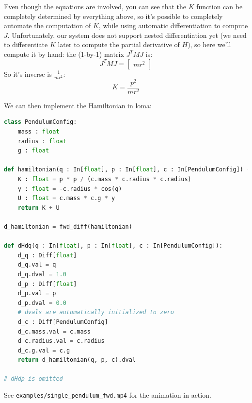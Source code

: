 Even though the equations are involved, you can see that the $K$ function can be completely determined by everything above, so it's possible to completely automate the computation of $K$, while using automatic differentiation to compute $J$. Unfortunately, our system does not support nested differentiation yet (we need to differentiate $K$ later to compute the partial derivative of $H$), so here we'll compute it by hand: the (1-by-1) matrix $J^TMJ$ is:
\begin{equation}
J^TMJ = 
\begin{bmatrix}
m r^2
\end{bmatrix}
\end{equation}
So it's inverse is $\frac{1}{mr^2}$:
\begin{equation}
K = \frac{p^2}{mr^2}
\end{equation}

We can then implement the Hamiltonian in loma:
\begin{lstlisting}[language=Python]
class PendulumConfig:
    mass : float
    radius : float
    g : float

def hamiltonian(q : In[float], p : In[float], c : In[PendulumConfig]) -> float:
    K : float = p * p / (c.mass * c.radius * c.radius)
    y : float = -c.radius * cos(q)
    U : float = c.mass * c.g * y
    return K + U

d_hamiltonian = fwd_diff(hamiltonian)

def dHdq(q : In[float], p : In[float], c : In[PendulumConfig]):
    d_q : Diff[float]
    d_q.val = q
    d_q.dval = 1.0
    d_p : Diff[float]
    d_p.val = p
    d_p.dval = 0.0
    # dvals are automatically initialized to zero
    d_c : Diff[PendulumConfig]
    d_c.mass.val = c.mass
    d_c.radius.val = c.radius
    d_c.g.val = c.g
    return d_hamiltonian(q, p, c).dval

# dHdp is omitted
\end{lstlisting}

See \lstinline{examples/single_pendulum_fwd.mp4} for the animation in action.


